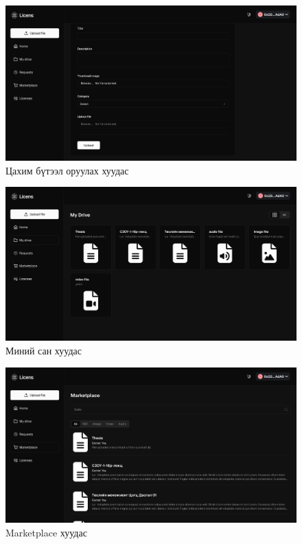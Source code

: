 \begin{figure}[h!]
	\centering
	\includegraphics[scale=0.15]{src/images/upload.png}
	\caption{Цахим бүтээл оруулах хуудас}
\end{figure}

\begin{figure}[h!]
	\centering
	\includegraphics[scale=0.16]{src/images/drive.png}
	\caption{Миний сан хуудас}
\end{figure}

\begin{figure}[h!]
	\centering
	\includegraphics[scale=0.16]{src/images/marketplace.png}
	\caption{Marketplace хуудас}
\end{figure}

